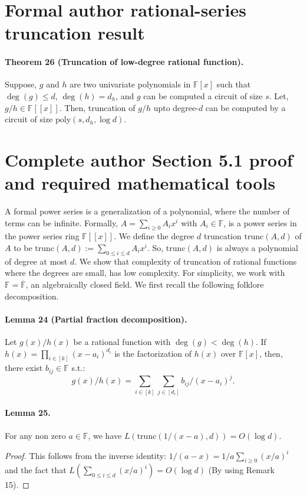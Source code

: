 \documentclass[10pt,a4paper]{article}
\begin{document}
\section*{Formal author rational-series truncation result}
\paragraph{Theorem 26 (Truncation of low-degree rational function).} Suppose, $g$ and $h$ are two univariate polynomials in $\mathbb F[x]$ such that $\deg(g)\le d$, $\deg(h)=d_h$, and $g$ can be computed a circuit of size $s$. Let, $g/h\in\mathbb F[[x]]$. Then, truncation of $g/h$ upto degree-$d$ can be computed by a circuit of size $\mathrm{poly}(s,d_h,\log d)$.

\section*{Complete author Section 5.1 proof and required mathematical tools}
A formal power series is a generalization of a polynomial, where the number of terms can be infinite. Formally, $A=\sum_{i\ge0}A_ix^i$ with $A_i\in\mathbb F$, is a power series in the power series ring $\mathbb F[[x]]$. We define the degree $d$ truncation $\mathrm{trunc}(A,d)$ of $A$ to be $\mathrm{trunc}(A,d):=\sum_{0\le i\le d}A_ix^i$. So, $\mathrm{trunc}(A,d)$ is always a polynomial of degree at most $d$.
We show that complexity of truncation of rational functions where the degrees are small, has low complexity. For simplicity, we work with $\mathbb F=\overline{\mathbb F}$, an algebraically closed field. We first recall the following folklore decomposition.
\paragraph{Lemma 24 (Partial fraction decomposition).} Let $g(x)/h(x)$ be a rational function with $\deg(g)<\deg(h)$. If $h(x)=\prod_{i\in[k]}(x-a_i)^{d_i}$ is the factorization of $h(x)$ over $\mathbb F[x]$, then, there exist $b_{ij}\in\mathbb F$ s.t.:
\[g(x)/h(x)=\sum_{i\in[k]}\sum_{j\in[d_i]}b_{ij}/(x-a_i)^j.\]
\paragraph{Lemma 25.} For any non zero $a\in\mathbb F$, we have $L(\mathrm{trunc}(1/(x-a),d))=O(\log d)$.
\begin{proof}This follows from the inverse identity: $1/(a-x)=1/a\sum_{i\ge0}(x/a)^i$ and the fact that $L(\sum_{0\le i\le d}(x/a)^i)=O(\log d)$ (By using Remark 15).\end{proof}
\end{document}
